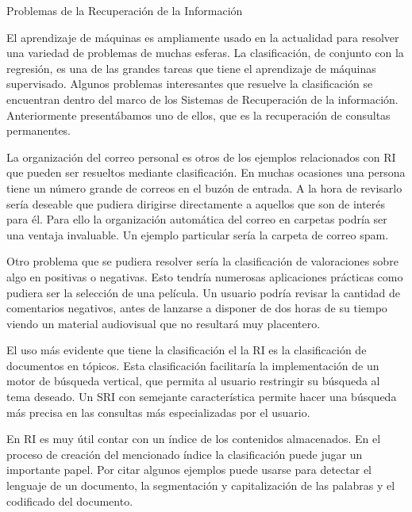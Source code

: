 \documentclass{llncs}
\begin{document}
	\begin{subsection}{Problemas de la Recuperaci\'on de la Informaci\'on} \label{App_RI}
		
		El aprendizaje de m\'aquinas es ampliamente usado en la actualidad para resolver una variedad de problemas de muchas esferas. La clasificaci\'on, de conjunto con la regresi\'on, es una de las grandes tareas que tiene el aprendizaje de m\'aquinas supervisado. Algunos problemas interesantes que resuelve la clasificaci\'on se encuentran dentro del marco de los Sistemas de Recuperaci\'on de la informaci\'on. Anteriormente present\'abamos uno de ellos, que es la recuperaci\'on de consultas permanentes.
		
		La organizaci\'on del correo personal es otros de los ejemplos relacionados con RI que pueden ser resueltos mediante clasificaci\'on. En muchas ocasiones una persona tiene un n\'umero grande de correos en el buz\'on de entrada. A la hora de revisarlo ser\'ia deseable que pudiera dirigirse directamente a aquellos que son de inter\'es para \'el. Para ello la organizaci\'on autom\'atica del correo en carpetas podr\'ia ser una ventaja invaluable. Un ejemplo particular ser\'ia la carpeta de correo spam.
		
		Otro problema que se pudiera resolver ser\'ia la clasificaci\'on de valoraciones sobre algo en positivas o negativas. Esto tendr\'ia numerosas aplicaciones pr\'acticas como pudiera ser la selecci\'on de una pel\'icula. Un usuario podr\'ia revisar la cantidad de comentarios negativos, antes de lanzarse a disponer de dos horas de su tiempo viendo un material audiovisual que no resultar\'a muy placentero.
		
		El uso m\'as evidente que tiene la clasificaci\'on el la RI es la clasificaci\'on de documentos en t\'opicos. Esta clasificaci\'on facilitar\'ia la implementaci\'on de un motor de b\'usqueda vertical, que permita al usuario restringir su b\'usqueda al tema deseado. Un SRI con semejante caracter\'istica permite hacer una b\'usqueda m\'as precisa en las consultas m\'as especializadas por el usuario.
		
		En RI es muy \'util contar con un \'indice de los contenidos almacenados. En el proceso de creaci\'on del mencionado \'indice la clasificaci\'on puede jugar un importante papel. Por citar algunos ejemplos puede usarse para detectar el lenguaje de un documento, la segmentaci\'on y capitalizaci\'on de las palabras y el codificado del documento.
		
		
	\end{subsection}
\end{document}
